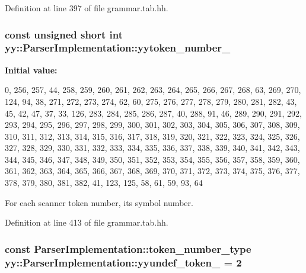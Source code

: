 Definition at line 397 of file grammar.tab.hh.

\hypertarget{classyy_1_1_parser_implementation_a9b7ed8857471d6f1fe03d524f1aae6a5}{
\subsubsection[{yytoken\_\-number\_\-}]{\setlength{\rightskip}{0pt plus 5cm}const unsigned short int {\bf yy::ParserImplementation::yytoken\_\-number\_\-}}}
\label{classyy_1_1_parser_implementation_a9b7ed8857471d6f1fe03d524f1aae6a5}
{\bfseries Initial value:}
\begin{DoxyCode}

  {
         0,   256,   257,    44,   258,   259,   260,   261,   262,   263,
     264,   265,   266,   267,   268,    63,   269,   270,   124,    94,
      38,   271,   272,   273,   274,    62,    60,   275,   276,   277,
     278,   279,   280,   281,   282,    43,    45,    42,    47,    37,
      33,   126,   283,   284,   285,   286,   287,    40,   288,    91,
      46,   289,   290,   291,   292,   293,   294,   295,   296,   297,
     298,   299,   300,   301,   302,   303,   304,   305,   306,   307,
     308,   309,   310,   311,   312,   313,   314,   315,   316,   317,
     318,   319,   320,   321,   322,   323,   324,   325,   326,   327,
     328,   329,   330,   331,   332,   333,   334,   335,   336,   337,
     338,   339,   340,   341,   342,   343,   344,   345,   346,   347,
     348,   349,   350,   351,   352,   353,   354,   355,   356,   357,
     358,   359,   360,   361,   362,   363,   364,   365,   366,   367,
     368,   369,   370,   371,   372,   373,   374,   375,   376,   377,
     378,   379,   380,   381,   382,    41,   123,   125,    58,    61,
      59,    93,    64
  }
\end{DoxyCode}


For each scanner token number, its symbol number. 



Definition at line 413 of file grammar.tab.hh.

\hypertarget{classyy_1_1_parser_implementation_ae165b3749bef9df3a32f28b146f23af9}{
\subsubsection[{yyundef\_\-token\_\-}]{\setlength{\rightskip}{0pt plus 5cm}const {\bf ParserImplementation::token\_\-number\_\-type} {\bf yy::ParserImplementation::yyundef\_\-token\_\-} = 2}}
\label{classyy_1_1_parser_implementation_ae165b3749bef9df3a32f28b146f23af9}


